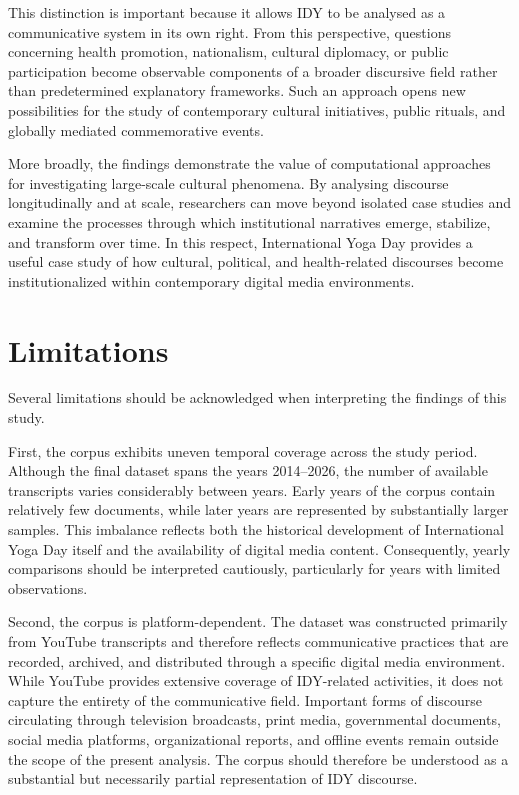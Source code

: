 \documentclass[11pt]{article}
\begin{document}
This distinction is important because it allows IDY to be analysed as a communicative system in its own right. From this
perspective, questions concerning health promotion, nationalism, cultural diplomacy, or public participation become
observable components of a broader discursive field rather than predetermined explanatory frameworks. Such an approach
opens new possibilities for the study of contemporary cultural initiatives, public rituals, and globally mediated
commemorative events.


More broadly, the findings demonstrate the value of computational approaches for investigating large-scale cultural
phenomena. By analysing discourse longitudinally and at scale, researchers can move beyond isolated case studies and
examine the processes through which institutional narratives emerge, stabilize, and transform over time. In this
respect, International Yoga Day provides a useful case study of how cultural, political, and health-related discourses
become institutionalized within contemporary digital media environments.


\section{Limitations}



Several limitations should be acknowledged when interpreting the findings of this study.



First, the corpus exhibits uneven temporal coverage across the study period. Although the final dataset spans the years
2014--2026, the number of available transcripts varies considerably between years. Early years of the corpus contain
relatively few documents, while later years are represented by substantially larger samples. This imbalance reflects
both the historical development of International Yoga Day itself and the availability of digital media content.
Consequently, yearly comparisons should be interpreted cautiously, particularly for years with limited observations.


Second, the corpus is platform-dependent. The dataset was constructed primarily from YouTube transcripts and therefore
reflects communicative practices that are recorded, archived, and distributed through a specific digital media
environment. While YouTube provides extensive coverage of IDY-related activities, it does not capture the entirety of
the communicative field. Important forms of discourse circulating through television broadcasts, print media,
governmental documents, social media platforms, organizational reports, and offline events remain outside the scope of
the present analysis. The corpus should therefore be understood as a substantial but necessarily partial representation
of IDY discourse.
\end{document}
